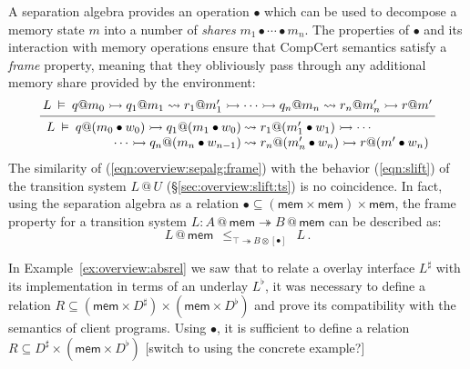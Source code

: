 \documentclass[acmsmall,screen,review,anonymous]{acmart}
\newcommand{\kw}[1]{\ensuremath{ \mathsf{#1} }}
\begin{document}

A separation algebra \citep{sepalg} provides an operation $\bullet$
which can be used to decompose a memory state $m$ into
a number of \emph{shares}
$
  m_1 \bullet \cdots \bullet m_n
$.
The properties of $\bullet$
and its interaction with memory operations
ensure that CompCert semantics satisfy
a \emph{frame} property,
meaning that they
obliviously pass through
any additional memory share
provided by the environment:
\begin{equation} \label{eqn:overview:sepalg:frame}
  \begin{prooftree}
  \hypo{
  L \:\vDash\: q@m_0 \rightarrowtail
    q_1@m_1 \leadsto r_1@m_1' \rightarrowtail
    \cdots \rightarrowtail
    q_n@m_n \leadsto r_n@m_n' \rightarrowtail
    r@m'}
  \infer1{
   {\begin{array}{r@{\:}l}
    L \:\vDash\: q@(m_0 \bullet w_0) \rightarrowtail
      q_1@(m_1 \bullet w_0) &\leadsto r_1@(m_1' \bullet w_1) \rightarrowtail
      \cdots \\ \cdots \rightarrowtail
      q_n@(m_n \bullet w_{n-1}) &\leadsto r_n@(m_n' \bullet w_n) \rightarrowtail
      r@(m' \bullet w_n)
   \end{array}} }
  \end{prooftree}
\end{equation}
The similarity of (\ref{eqn:overview:sepalg:frame})
with the behavior (\ref{eqn:slift})
of the transition system $L \mathbin@ U$ (\S\ref{sec:overview:slift:ts})
is no coincidence.
In fact,
using the separation algebra as a relation
${\bullet} \subseteq (\kw{mem} \times \kw{mem}) \times \kw{mem}$,
the frame property for a transition system
$L : A \mathbin@ \kw{mem} \twoheadrightarrow B \mathbin@ \kw{mem}$
can be described as:
\[
  L \mathbin@ \kw{mem}
  \:\:
  \le_{\top \twoheadrightarrow B \otimes [\bullet]}
  \:\:
  L
  \,.
\]

\begin{example}
In Example~\ref{ex:overview:absrel} we saw that to relate a overlay interface
$L^\sharp$
with its implementation in terms of an underlay $L^\flat$,
it was necessary to define a relation
$R \subseteq (\kw{mem} \times D^\sharp) \times (\kw{mem} \times D^\flat)$
and prove its compatibility with the semantics of client programs.
Using $\bullet$,
it is sufficient to define a relation
$R \subseteq D^\sharp \times (\kw{mem} \times D^\flat)$
[switch to using the concrete example?]
\end{example}
\end{document}
